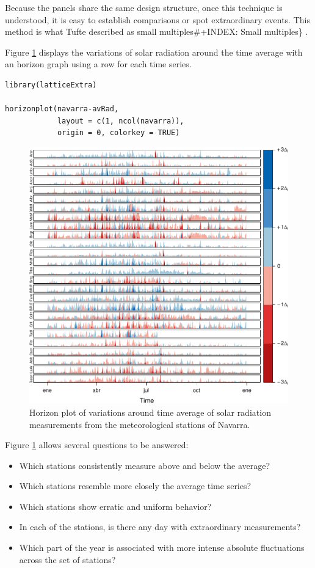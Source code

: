 Because the panels share the same design structure, once this
technique is understood, it is easy to establish comparisons or spot
extraordinary events.  This method is what Tufte described as small
multiples\#+INDEX: Small multiples\} \cite{Tufte1990}.

Figure \ref{fig:navarraHorizonplot} displays the variations of
solar radiation around the time average with an horizon graph
using a row for each time series.


\lstset{language=r,label= ,caption= ,captionpos=b,numbers=none}
\begin{lstlisting}
library(latticeExtra)
  
horizonplot(navarra-avRad,
            layout = c(1, ncol(navarra)),
            origin = 0, colorkey = TRUE)
\end{lstlisting}

\begin{figure}[htbp]
\centering
\includegraphics[width=.9\linewidth]{figs/navarraHorizonplot.pdf}
\caption{Horizon plot of variations around time average of solar radiation measurements from the meteorological stations of Navarra. \label{fig:navarraHorizonplot}}
\end{figure}

Figure \ref{fig:navarraHorizonplot} allows several questions to be
answered:
\begin{itemize}
\item Which stations consistently measure above and below the average?
\item Which stations resemble more closely the average time series?
\item Which stations show erratic and uniform behavior?
\item In each of the stations, is there any day with extraordinary measurements?
\item Which part of the year is associated with more intense
absolute fluctuations across the set of stations?
\end{itemize}

